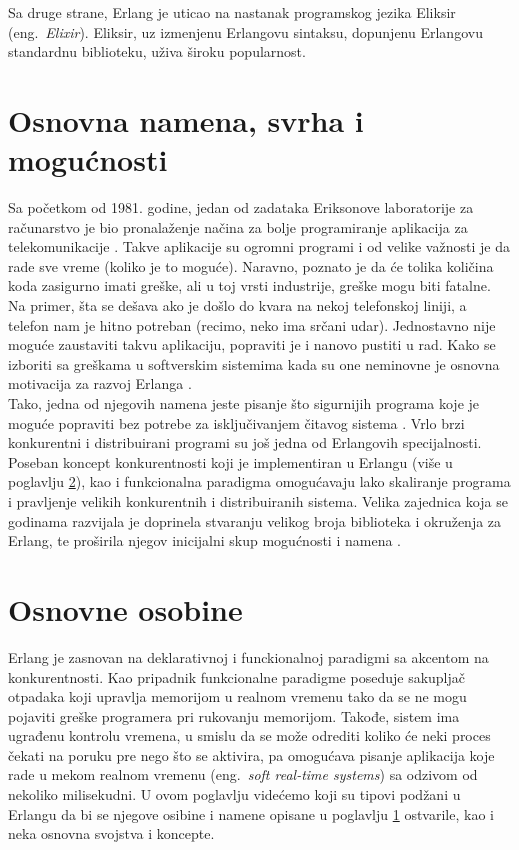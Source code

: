 \documentclass[a4paper]{article}
\begin{document}
{Sa druge strane, Erlang je uticao na nastanak programskog jezika Eliksir (eng.~{\em Elixir}). Eliksir,
uz izmenjenu Erlangovu sintaksu, dopunjenu Erlangovu standardnu biblioteku, uživa široku popularnost.

\section{Osnovna namena, svrha i mogućnosti}
\label{sec:namena}

Sa početkom od 1981. godine, jedan od zadataka Eriksonove laboratorije za računarstvo je bio pronalaženje načina za bolje programiranje aplikacija
za telekomunikacije \cite{phdthesis}. Takve aplikacije su ogromni programi i od velike važnosti je da rade sve vreme (koliko je to moguće). 
Naravno, poznato je da će tolika količina koda zasigurno imati greške, ali u toj vrsti industrije, greške mogu biti fatalne. Na primer, 
šta se dešava ako je došlo do kvara na nekoj telefonskoj liniji, a telefon nam je hitno potreban (recimo, neko ima srčani udar).
Jednostavno nije moguće zaustaviti takvu aplikaciju, popraviti je i nanovo pustiti u rad.
Kako se izboriti sa greškama u softverskim sistemima kada su one neminovne je osnovna motivacija za razvoj Erlanga \cite{phdthesis}. \\

Tako, jedna od njegovih namena jeste pisanje što sigurnijih programa koje je moguće popraviti bez potrebe za isključivanjem čitavog sistema \cite{book_joe}.
Vrlo brzi konkurentni i distribuirani programi su još jedna od Erlangovih specijalnosti. 
Poseban koncept konkurentnosti koji je implementiran u Erlangu (više u poglavlju \ref{sec:osobine}), kao i funkcionalna paradigma 
omogućavaju lako skaliranje programa i pravljenje velikih konkurentnih i distribuiranih sistema.
Velika zajednica koja se godinama razvijala je doprinela stvaranju velikog broja biblioteka i okruženja za Erlang, te proširila njegov 
inicijalni skup mogućnosti i namena \cite{book_joe}. 

\section{Osnovne osobine}
\label{sec:osobine}
Erlang je zasnovan na deklarativnoj i funckionalnoj paradigmi sa akcentom na konkurentnosti. 
Kao pripadnik funkcionalne paradigme poseduje sakupljač otpadaka 
koji upravlja memorijom u realnom vremenu tako da se ne mogu pojaviti greške programera pri rukovanju memorijom. 
Takođe, sistem ima ugrađenu kontrolu vremena, 
u smislu da se može odrediti koliko će neki proces čekati na poruku pre nego što se aktivira, 
pa omogućava pisanje aplikacija koje rade u mekom realnom vremenu (eng.~{\em soft real-time systems}) sa odzivom od nekoliko milisekudni. 
U ovom poglavlju videćemo koji su tipovi podžani u Erlangu da bi se njegove osibine i namene opisane u poglavlju \ref{sec:namena} ostvarile, 
kao i neka osnovna svojstva i koncepte.



}
\end{document}
